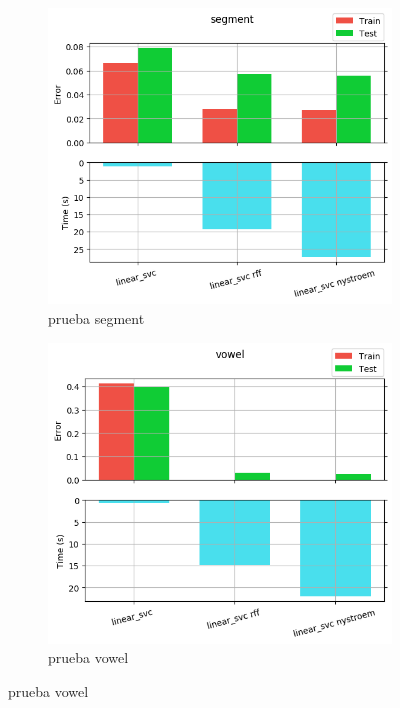 \begin{figure}[ht]
  \centering
  \begin{subfigure}[b]{0.5\linewidth}
    \centering\includegraphics[width=\imgscale\linewidth]{Figures/2_5/segment}
    \caption{prueba segment}
    \label{fig:2_5_segment}
  \end{subfigure}%
  \begin{subfigure}[b]{0.5\linewidth}
    \centering\includegraphics[width=\imgscale\linewidth]{Figures/2_5/vowel}
    \caption{prueba vowel}
    \label{fig:2_5_vowel}
  \end{subfigure}
\end{figure}
